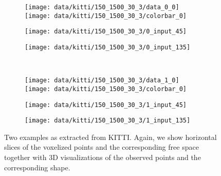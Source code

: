 \begin{figure}
  \centering  
  \vspace{-0.25cm}
  \begin{subfigure}[t]{0.425\textwidth}
    \vspace{0px}
    \texttt{[image: data/kitti/150\_1500\_30\_3/data\_0\_0]}\\
    \hspace*{-0.25cm}\texttt{[image: data/kitti/150\_1500\_30\_3/colorbar\_0]}
  \end{subfigure}
  \begin{subfigure}[t]{0.2\textwidth}
    \vspace{0px}
    \texttt{[image: data/kitti/150\_1500\_30\_3/0\_input\_45]}
  \end{subfigure}
  \begin{subfigure}[t]{0.2\textwidth}
    \vspace{0px}
    \texttt{[image: data/kitti/150\_1500\_30\_3/0\_input\_135]}
  \end{subfigure}\\[-4px]
  \begin{subfigure}[t]{0.425\textwidth}
    \vspace{0px}
    \texttt{[image: data/kitti/150\_1500\_30\_3/data\_1\_0]}\\
    \hspace*{-0.25cm}\texttt{[image: data/kitti/150\_1500\_30\_3/colorbar\_0]}
  \end{subfigure}
  \begin{subfigure}[t]{0.2\textwidth}
    \vspace{0px}
    \texttt{[image: data/kitti/150\_1500\_30\_3/1\_input\_45]}
  \end{subfigure}
  \begin{subfigure}[t]{0.2\textwidth}
    \vspace{0px}
    \texttt{[image: data/kitti/150\_1500\_30\_3/1\_input\_135]}
  \end{subfigure}
  
  \caption{Two examples as extracted from KITTI. Again, we show horizontal slices
  of the voxelized points and the corresponding free space together with 3D visualizations
  of the observed points and the corresponding shape.}
  \label{fig:data-kitti-examples}
\end{figure}

